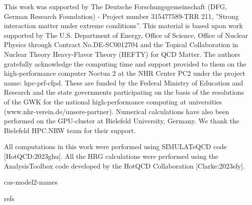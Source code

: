 \documentclass[11pt,a4paper]{article}
\begin{document}
This work was supported by The Deutsche Forschungsgemeinschaft (DFG, German Research Foundation) - Project number 315477589-TRR 211,
”Strong interaction matter under extreme conditions”. This material is based upon work supported by The U.S. Department of Energy, Office of Science, Office of Nuclear Physics through Contract No.DE-SC0012704 and the Topical Collaboration in Nuclear Theory Heavy-Flavor Theory (HEFTY) for QCD Matter.
The authors gratefully acknowledge the
computing time and support provided to them on the high-performance computer Noctua 2 at the NHR Center
PC2 under the project name: hpc-prf-cfpd. These are funded by the Federal Ministry of Education
and Research and the state governments participating on the basis of the resolutions of the GWK
for the national high-performance computing at universities (www.nhr-verein.de/unsere-partner).
Numerical calculations have also been performed on the
GPU-cluster at Bielefeld University, Germany. We thank the Bielefeld HPC.NRW team for their support.

All computations in this work were performed using SIMULATeQCD code [HotQCD:2023ghu]. All the HRG calculations were performed using the AnalysisToolbox code developed by the HotQCD Collaboration [Clarke:2023sfy].

cas-model2-names

refs
\end{document}
